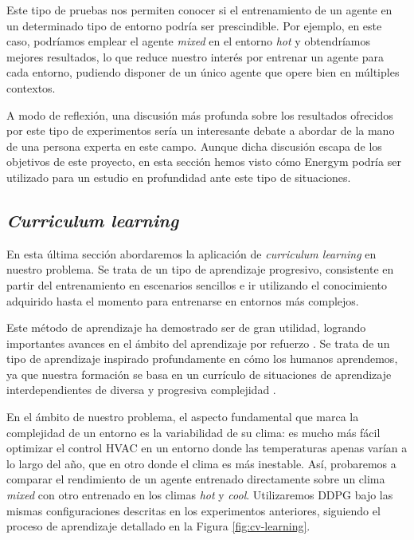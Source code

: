 Este tipo de pruebas nos permiten conocer si el entrenamiento de un agente en un determinado tipo de entorno podría ser prescindible. Por ejemplo, en este caso, podríamos emplear el agente \textit{mixed} en el entorno \textit{hot} y obtendríamos mejores resultados, lo que reduce nuestro interés por entrenar un agente para cada entorno, pudiendo disponer de un único agente que opere bien en múltiples contextos.

A modo de reflexión, una discusión más profunda sobre los resultados ofrecidos por este tipo de experimentos sería un interesante debate a abordar de la mano de una persona experta en este campo. Aunque dicha discusión escapa de los objetivos de este proyecto, en esta sección hemos visto cómo Energym podría ser utilizado para un estudio en profundidad ante este tipo de situaciones.

\subsection{\textit{Curriculum learning}}
\label{sec:cv-learning}

En esta última sección abordaremos la aplicación de \textit{curriculum learning} en nuestro problema. Se trata de un tipo de aprendizaje progresivo, consistente en partir del entrenamiento en escenarios sencillos e ir utilizando el conocimiento adquirido hasta el momento para entrenarse en entornos más complejos.

Este método de aprendizaje ha demostrado ser de gran utilidad, logrando importantes avances en el ámbito del aprendizaje por refuerzo \cite{portelas2020automatic}. Se trata de un tipo de aprendizaje inspirado profundamente en cómo los humanos aprendemos, ya que nuestra formación se basa en un currículo de situaciones de aprendizaje interdependientes de diversa y progresiva complejidad \cite{narvekar2020curriculum}.

En el ámbito de nuestro problema, el aspecto fundamental que marca la complejidad de un entorno es la variabilidad de su clima: es mucho más fácil optimizar el control HVAC en un entorno donde las temperaturas apenas varían a lo largo del año, que en otro donde el clima es más inestable. Así, probaremos a comparar el rendimiento de un agente entrenado directamente sobre un clima \textit{mixed} con otro entrenado en los climas \textit{hot} y \textit{cool}. Utilizaremos DDPG bajo las mismas configuraciones descritas en los experimentos anteriores, siguiendo el proceso de aprendizaje detallado en la Figura \ref{fig:cv-learning}.

